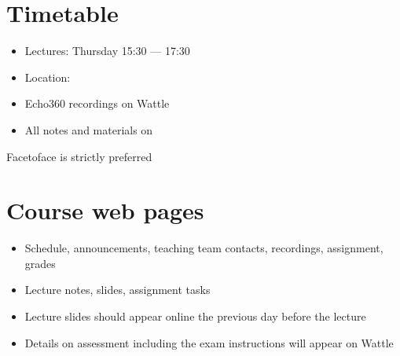 \documentclass[letterpaper,10pt,english]{jupyterBook}
\begin{document}
\section{Timetable}
\label{\detokenize{01.introduction:timetable}}
\sphinxAtStartPar
{}
\begin{itemize}
\item {} 
\sphinxAtStartPar
Lectures: Thursday 15:30 — 17:30

\item {} 
\sphinxAtStartPar
Location: 

\end{itemize}

\sphinxAtStartPar
{}
\begin{itemize}
\item {} 
\sphinxAtStartPar
Echo\sphinxhyphen{}360 recordings on Wattle

\item {} 
\sphinxAtStartPar
All notes and materials on 

\end{itemize}

\sphinxAtStartPar
Face\sphinxhyphen{}to\sphinxhyphen{}face is strictly preferred


\section{Course web pages}
\label{\detokenize{01.introduction:course-web-pages}}\begin{itemize}
\item {} 
\sphinxAtStartPar
{}
Schedule, announcements, teaching team contacts, recordings, assignment, grades

\item {} 
\sphinxAtStartPar
{}
Lecture notes, slides, assignment tasks

\item {} 
\sphinxAtStartPar
Lecture slides should appear online the previous day before the lecture

\item {} 
\sphinxAtStartPar
Details on assessment including the exam instructions will appear on Wattle

\end{itemize}
\end{document}
